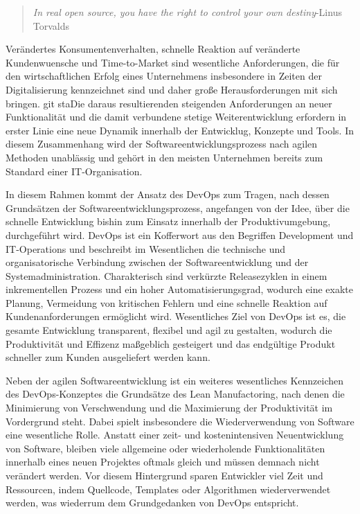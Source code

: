 \begin{quote}
\textit{In real open source, you have the right to control your own destiny}\newline -Linus Torvalds
\end{quote}

Verändertes Konsumentenverhalten, schnelle Reaktion auf veränderte Kundenwuensche und Time-to-Market sind wesentliche Anforderungen, die für den wirtschaftlichen Erfolg eines Unternehmens insbesondere in Zeiten der Digitalisierung kennzeichnet sind und daher große Herausforderungen mit sich bringen. git staDie daraus resultierenden steigenden Anforderungen an neuer Funktionalität und die damit verbundene stetige Weiterentwicklung erfordern in erster Linie eine neue Dynamik innerhalb der Entwicklug, Konzepte und Tools. In diesem Zusammenhang wird der Softwareentwicklungsprozess nach agilen Methoden unablässig und gehört in den meisten Unternehmen bereits zum Standard einer IT-Organisation. 

In diesem Rahmen kommt der Ansatz des DevOps zum Tragen, nach dessen Grundsätzen der Softwareentwicklungsprozess, angefangen von der Idee, über die schnelle Entwicklung bishin zum Einsatz innerhalb der Produktivumgebung, durchgeführt wird. DevOps ist ein Kofferwort aus den Begriffen Development und IT-Operations und beschreibt im Wesentlichen die technische und organisatorische Verbindung zwischen der Softwareentwicklung und der Systemadministration. Charakterisch sind verkürzte Releasezyklen in einem inkrementellen Prozess und ein hoher Automatisierungsgrad, wodurch eine exakte Planung, Vermeidung von kritischen Fehlern und eine schnelle Reaktion auf Kundenanforderungen ermöglicht wird. Wesentliches Ziel von DevOps ist es, die gesamte Entwicklung transparent, flexibel und agil zu gestalten, wodurch die Produktivität und Effizenz maßgeblich gesteigert und das endgültige Produkt schneller zum Kunden ausgeliefert werden kann. 

Neben der agilen Softwareentwicklung ist ein weiteres wesentliches Kennzeichen des DevOps-Konzeptes die Grundsätze des Lean Manufactoring, nach denen die Minimierung von Verschwendung und die Maximierung der Produktivität im Vordergrund steht. Dabei spielt insbesondere die Wiederverwendung von Software eine wesentliche Rolle. Anstatt einer zeit- und kostenintensiven Neuentwicklung von Software, bleiben viele allgemeine oder wiederholende Funktionalitäten innerhalb eines neuen Projektes oftmals gleich und müssen demnach nicht verändert werden. Vor diesem Hintergrund sparen Entwickler viel Zeit und Ressourcen, indem Quellcode, Templates oder Algorithmen wiederverwendet werden, was wiederrum dem Grundgedanken von DevOps entspricht. 

